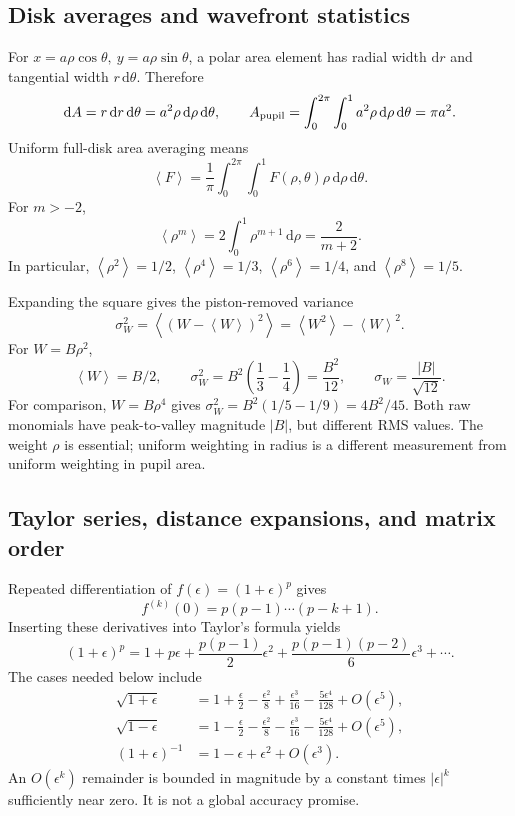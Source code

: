 \documentclass[11pt,a4paper]{article}
\numberwithin{equation}{section}
\newcommand{\dd}{\mathrm{d}}
\newcommand{\avg}[1]{\left\langle #1\right\rangle}
\begin{document}
\subsection{Disk averages and wavefront statistics}
For $x=a\rho\cos\theta,\ y=a\rho\sin\theta$, a polar area element has
radial width $\dd r$ and tangential width $r\,\dd\theta$. Therefore
\[
 \dd A=r\,\dd r\,\dd\theta=a^2\rho\,\dd\rho\,\dd\theta,
 \qquad
 A_{\rm pupil}=\int_0^{2\pi}\int_0^1 a^2\rho\,\dd\rho\,\dd\theta=\pi a^2.
\]
Uniform full-disk area averaging means
\begin{equation}
 \avg{F}=\frac1\pi\int_0^{2\pi}\int_0^1
 F(\rho,\theta)\rho\,\dd\rho\,\dd\theta.
 \label{eq:average}
\end{equation}
For $m>-2$,
\begin{equation}
 \avg{\rho^m}=2\int_0^1\rho^{m+1}\,\dd\rho=\frac{2}{m+2}.
\end{equation}
In particular, $\avg{\rho^2}=1/2$, $\avg{\rho^4}=1/3$,
$\avg{\rho^6}=1/4$, and $\avg{\rho^8}=1/5$.

Expanding the square gives the piston-removed variance
\begin{equation}
 \sigma_W^2=\avg{(W-\avg W)^2}
 =\avg{W^2}-\avg W^2.
\end{equation}
For $W=B\rho^2$,
\[
 \avg W=B/2,\qquad
 \sigma_W^2=B^2\left(\frac13-\frac14\right)=\frac{B^2}{12},
 \qquad \sigma_W=\frac{|B|}{\sqrt{12}}.
\]
For comparison, $W=B\rho^4$ gives
$\sigma_W^2=B^2(1/5-1/9)=4B^2/45$. Both raw monomials have
peak-to-valley magnitude $|B|$, but different RMS values.
The weight $\rho$ is essential; uniform weighting in radius is a different
measurement from uniform weighting in pupil area.

\subsection{Taylor series, distance expansions, and matrix order}
Repeated differentiation of $f(\epsilon)=(1+\epsilon)^p$ gives
\[
 f^{(k)}(0)=p(p-1)\cdots(p-k+1).
\]
Inserting these derivatives into Taylor's formula yields
\[
 (1+\epsilon)^p
 =1+p\epsilon+\frac{p(p-1)}{2}\epsilon^2
 +\frac{p(p-1)(p-2)}6\epsilon^3+\cdots.
\]
The cases needed below include
\begin{align}
 \sqrt{1+\epsilon}
 &=1+\frac{\epsilon}{2}-\frac{\epsilon^2}{8}
 +\frac{\epsilon^3}{16}-\frac{5\epsilon^4}{128}+O(\epsilon^5),\\
 \sqrt{1-\epsilon}
 &=1-\frac{\epsilon}{2}-\frac{\epsilon^2}{8}
 -\frac{\epsilon^3}{16}-\frac{5\epsilon^4}{128}+O(\epsilon^5),\\
 (1+\epsilon)^{-1}&=1-\epsilon+\epsilon^2+O(\epsilon^3).
\end{align}
An $O(\epsilon^k)$ remainder is bounded in magnitude by a constant times
$|\epsilon|^k$ sufficiently near zero. It is not a global accuracy promise.
\end{document}
